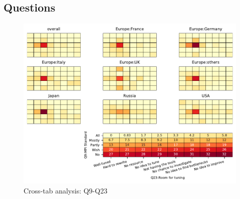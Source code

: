 
\subsection{Questions}


\begin{figure}
\begin{center}
\includegraphics[width=12cm]{../pdfs/Q9-Q23.pdf}
\caption{Cross-tab analysis: Q9-Q23}
\label{fig:Q9-Q23}
\end{center}
\end{figure}
